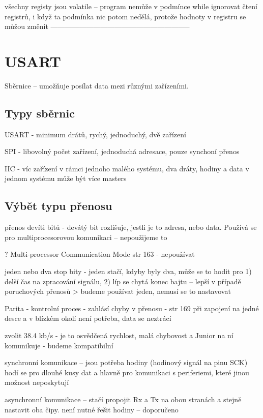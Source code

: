 všechny registy jsou volatile -- program nemůže v podmínce while ignorovat čtení registrů, i když ta podmínka nic potom nedělá, protože hodnoty v registru se můžou změnit  
-----------------------------------------------------------

\section{USART}


Sběrnice -- umožňuje posílat data mezi různými zařízeními.   

\subsection{Typy sběrnic}

USART - minimum drátů, rychý, jednoduchý, dvě zařízení 

SPI - libovolný počet zařízení, jednoduchá adresace, pouze synchoní přenos 

IIC - víc zařízení v rámci jednoho malého systému, dva dráty, hodiny a data 
v jednom systému může být více masters 
 
\subsection{Výbět typu přenosu }


přenos devíti bitů - devátý bit rozlišuje, jestli je to adresa, nebo data. 
Používá se pro multiprocesorovou komunikaci -- nepoužijeme to  

? Multi-processor Communication Mode str 163 - nepoužívat 

jeden nebo dva stop bity - jeden stačí, kdyby byly dva, může se to hodit pro 
1) delší čas na zpracování signálu, 
2) líp se chytá konec bajtu -- lepší v případě poruchových přenosů 
> budeme používat jeden, nemusí se to nastavovat 


 Parita - kontrolní proces - zahlásí chyby v přenosu - str 169 při zapojení na jedné desce a v blízkém okolí není potřeba, data se neztrácí 
 
 zvolit 38.4 kb/s - je to osvědčená rychlost, malá chybovost a Junior na ní komunikuje - budeme kompatibilní 
 
 synchronní komunikace -- jsou potřeba hodiny (hodinový signál na pinu SCK) 
 hodí se pro dlouhé kusy dat a hlavně pro komunikaci s periferiemi, které jinou možnost neposkytují 
 
 asynchronní komunikace -- stačí propojit Rx a Tx na obou stranách a stejně nastavit oba čipy. není nutné řešit hodiny --  doporučeno   
 
